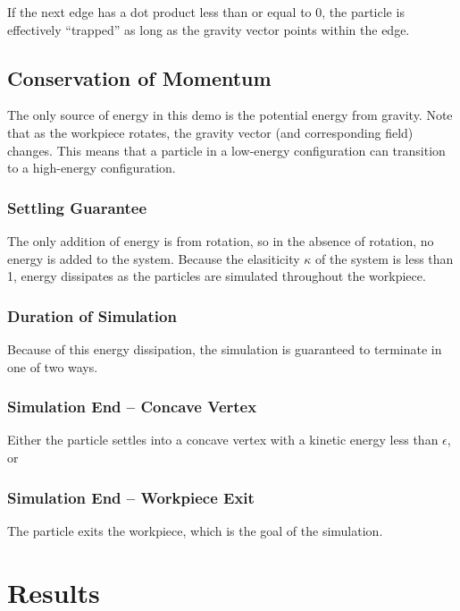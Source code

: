 		If the next edge has a dot product less than or equal to 0, the particle is effectively ``trapped'' as long as the gravity vector points within the edge.


	\subsection{Conservation of Momentum}

		The only source of energy in this demo is the potential energy from gravity. Note that as the workpiece rotates, the gravity vector (and corresponding field) changes. This means that a particle in a low-energy configuration can transition to a high-energy configuration.

		\subsubsection{Settling Guarantee}

		The only addition of energy is from rotation, so in the absence of rotation, no energy is added to the system. Because the elasiticity $\kappa$ of the system is less than 1, energy dissipates as the particles are simulated throughout the workpiece.

		\subsubsection{Duration of Simulation}

		Because of this energy dissipation, the simulation is guaranteed to terminate in one of two ways.

		\subsubsection{Simulation End -- Concave Vertex}

		Either the particle settles into a concave vertex with a kinetic energy less than $\epsilon$, or

		\subsubsection{Simulation End -- Workpiece Exit}

		The particle exits the workpiece, which is the goal of the simulation.

\section{Results}

